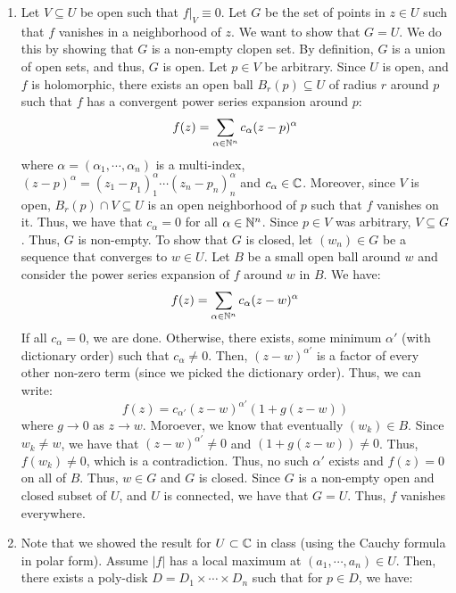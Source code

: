 \documentclass[12pt]{article}
\begin{document}
\begin{solution}
    \bbni
    \begin{enumerate}
        \item Let $V \subseteq U$ be open such that $f|_V \equiv 0$. Let $G$ be the set of points in $z \in U$ such that $f$ vanishes in a neighborhood of $z$. We want to show that $G = U$. We do this by showing that $G$ is a non-empty clopen set. \bbni        
        By definition, $G$ is a union of open sets, and thus, $G$ is open. \bbni
        Let $p \in V$ be arbitrary. Since $U$ is open, and $f$ is holomorphic, there exists an open ball $B_r(p) \subseteq U$ of radius $r$ around $p$ such that $f$ has a convergent power series expansion around $p$:
        \[ f(z) = \sum_{\alpha \in \mathbb N^n} c_\alpha (z-p)^\alpha \]
        where $\alpha = (\alpha_1, \cdots, \alpha_n)$ is a multi-index, $(z-p)^\alpha = (z_1-p_1)^\alpha_1 \cdots (z_n-p_n)^\alpha_n$ and $c_\alpha \in \mathbb C$. Moreover, since $V$ is open, $B_r(p) \cap V \subseteq U$ is an open neighborhood of $p$ such that $f$ vanishes on it. Thus, we have that $c_\alpha = 0$ for all $\alpha \in \mathbb N^n$. Since $p\in V$ was arbitrary, $V \subseteq G$. Thus, $G$ is non-empty.  \bbni
        To show that $G$ is closed, let $(w_n) \in G$ be a sequence that converges to $w \in U$. Let $B$ be a small open ball around $w$ and consider the power series expansion of $f$ around $w$ in $B$. We have: 
        \[f(z) = \sum_{\alpha \in \mathbb N^n} c_\alpha(z-w)^\alpha\]
        If all $c_\alpha = 0$, we are done. Otherwise, there exists, some minimum $\alpha'$ (with dictionary order) such that $c_\alpha \neq 0$. Then, $(z-w)^{\alpha'}$ is a factor of every other non-zero term (since we picked the dictionary order).
        Thus, we can write: 
        \[f(z) = c_{\alpha'}(z-w)^{\alpha'}(1+g(z-w)) \]
        where $g \to 0$ as $z \to w$. Moroever, we know that eventually $(w_k) \in B$. Since $w_k \neq w$, we have that $(z-w)^{\alpha'} \neq 0$ and $(1+g(z-w)) \neq 0$. Thus, $f(w_k) \neq 0$, which is a contradiction. Thus, no such $\alpha'$ exists and $f(z) = 0$ on all of $B$. Thus, $w \in G$ and $G$ is closed. \bbni
        Since $G$ is a non-empty open and closed subset of $U$, and $U$ is connected, we have that $G = U$. Thus, $f$ vanishes everywhere.
        \item Note that we showed the result for $U \subset \mathbb C$ in class (using the Cauchy formula in polar form). Assume $|f|$ has a local maximum at $(a_1, \cdots, a_n) \in U$. Then, there exists a poly-disk $D = D_1 \times \cdots \times D_n$ such that for $p \in D$, we have: 

\end{enumerate}
\end{solution}
\end{document}
